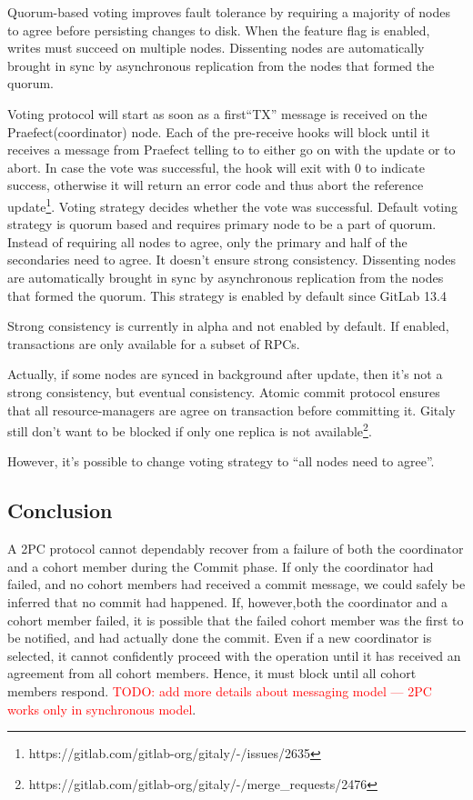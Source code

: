 \documentclass[sigplan, screen, nonacm, 11pt]{acmart}
\newcommand{\todo}[1]{\textcolor{red}{TODO: #1}}
\begin{document}
Quorum-based voting improves fault tolerance by requiring a majority of nodes to agree before persisting changes to disk.
When the feature flag is enabled, writes must succeed on multiple nodes.
Dissenting nodes are automatically brought in sync by asynchronous replication from the nodes that formed the quorum.

Voting protocol will start as soon as a first``TX'' message is received on the Praefect(coordinator) node.
Each of the pre-receive hooks will block until it receives a message from Praefect telling to to either go on with the update or to abort.
In case the vote was successful, the hook will exit with 0 to indicate success, otherwise it will return an error code and thus abort the reference update\footnote{https://gitlab.com/gitlab-org/gitaly/-/issues/2635}.
Voting strategy decides whether the vote was successful.
Default voting strategy is quorum based and requires primary node to be a part of quorum.
Instead of requiring all nodes to agree, only the primary and half of the secondaries need to agree.
It doesn't ensure strong consistency.
Dissenting nodes are automatically brought in sync by asynchronous replication from the nodes that formed the quorum.
This strategy is enabled by default since GitLab 13.4

Strong consistency is currently in alpha and not enabled by default.
If enabled, transactions are only available for a subset of RPCs.

Actually, if some nodes are synced in background after update, then it's not a strong consistency, but eventual consistency.
Atomic commit protocol ensures that all resource-managers are agree on transaction before committing it.
Gitaly still don't want to be blocked if only one replica is not available\footnote{https://gitlab.com/gitlab-org/gitaly/-/merge\_requests/2476}.

However, it's possible to change voting strategy to ``all nodes need to agree''.


\subsection{Conclusion}

A 2PC protocol cannot dependably recover from a failure of both the coordinator and a cohort member during the Commit phase.
If only the coordinator had failed, and no cohort members had received a commit message, we could safely be inferred
that no commit had happened.
If, however,both the coordinator and a cohort member failed, it is possible that the failed cohort member was the first
to be notified, and had actually done the commit.
Even if a new coordinator is selected, it cannot confidently proceed with the operation until it has received
an agreement from all cohort members. Hence, it must block until all cohort members respond.
\todo{add more details about messaging model --- 2PC works only in synchronous model}.
\end{document}

